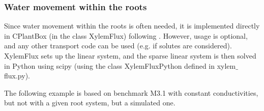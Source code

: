 \subsubsection*{Water movement within the roots} \label{sssec:xylem}

Since water movement within the roots is often needed, it is implemented directly in CPlantBox (in the class XylemFlux) following \cite{meunier2017hybrid}. However, usage is optional, and any other transport code can be used (e.g. if solutes are considered). XylemFlux sets up the linear system, and the sparse linear system is then solved in Python using scipy (using the class XylemFluxPython defined in xylem$\_$flux.py).

The following example is based on benchmark M3.1 \citep{schnepf2019call} with constant conductivities, but not with a given root system, but a simulated one.

